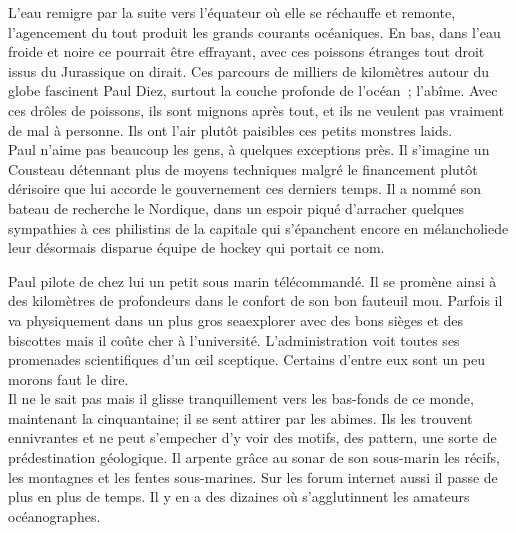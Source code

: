 \documentclass{article}
\begin{document}
L’eau remigre par la suite vers l’équateur où elle se réchauffe et remonte,
l’agencement du tout produit les grands courants océaniques. En bas, dans l’eau
froide et noire ce pourrait être effrayant, avec ces poissons étranges tout
droit issus du Jurassique on dirait. Ces parcours de milliers de kilomètres
autour du globe fascinent Paul Diez, surtout la couche profonde de l’océan ;
l’abîme. Avec ces drôles de poissons, ils sont mignons après tout, et ils ne
veulent pas vraiment de mal à personne. Ils ont l’air plutôt paisibles ces
petits monstres laids.\\

Paul n'aime pas beaucoup les gens, à quelques exceptions près. Il s'imagine un
Cousteau détennant plus de moyens techniques malgré le financement plutôt
dérisoire que lui accorde le gouvernement ces derniers temps. Il a nommé son
bateau de recherche le Nordique, dans un espoir piqué d'arracher quelques
sympathies à ces philistins de la capitale qui s'épanchent encore en
mélancholiede leur désormais disparue équipe de hockey qui portait ce nom.


Paul pilote de chez lui un petit sous marin télécommandé. Il se promène ainsi à
des kilomètres de profondeurs dans le confort de son bon fauteuil mou. Parfois
il va physiquement dans un plus gros seaexplorer avec des bons sièges et des
biscottes mais il coûte cher à l’université. L’administration voit toutes ses
promenades scientifiques d’un œil sceptique. Certains d’entre eux sont un peu
morons faut le dire.  \\


Il ne le sait pas mais il glisse tranquillement vers les bas-fonds de ce monde,
maintenant la cinquantaine; il se sent attirer par les abimes. Ils les trouvent
ennivrantes et ne peut s'empecher d'y voir des motifs, des pattern, une sorte de
prédestination géologique. Il arpente grâce au sonar de son sous-marin les
récifs, les montagnes et les fentes sous-marines. Sur les forum internet aussi
il passe de plus en plus de temps. Il y en a des dizaines où s'agglutinnent les
amateurs océanographes.
\end{document}
